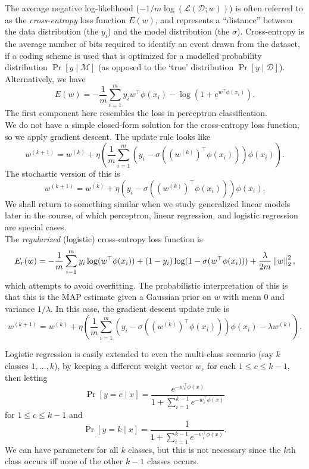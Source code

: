 \documentclass{article}
\begin{document}
		The average negative log-likelihood ($- 1/m \log(\mathcal{L}(\mathcal{D};w))$) is often referred to as the \emph{cross-entropy} loss function $E(w)$, and represents a ``distance'' between the data distribution (the $y_i$) and the model distribution (the $\sigma$). Cross-entropy is the average number of bits required to identify an event drawn from the dataset, if a coding scheme is used that is optimized for a modelled probability distribution $\Pr[y\mid\mathcal{M}]$ (as opposed to the `true' distribution $\Pr[y\mid\mathcal{D}]$).\\
		Alternatively, we have
		\[ E(w) = - \frac{1}{m} \sum_{i=1}^m y_i w^\top \phi(x_i) - \log(1 + e^{w^\top\phi(x_i)}). \]
		The first component here resembles the loss in perceptron classification.\\
		We do not have a simple closed-form solution for the cross-entropy loss function, so we apply gradient descent. The update rule looks like
		\[ w^{(k+1)} = w^{(k)} + \eta \left(\frac{1}{m} \sum_{i=1}^m (y_i - \sigma((w^{(k)})^\top\phi(x_i))) \phi(x_i) \right). \]
		The stochastic version of this is
		\[ w^{(k+1)} = w^{(k)} + \eta (y_i - \sigma((w^{(k)})^\top\phi(x_i))) \phi(x_i). \]
		We shall return to something similar when we study generalized linear models later in the course, of which perceptron, linear regression, and logistic regression are special cases.\\
		The \emph{regularized} (logistic) cross-entropy loss function is
		\[ E_r(w) = -\frac{1}{m} \sum_{i=1}^m y_i \log(w^\top \phi(x_i)) + (1 - y_i) \log(1-\sigma(w^\top\phi(x_i))) + \frac{\lambda}{2m}\left\lVert w\right\rVert_2^2, \]
		which attempts to avoid overfitting. The probabilistic interpretation of this is that this is the MAP estimate given a Gaussian prior on $w$ with mean $0$ and variance $1/\lambda$. In this case, the gradient descent update rule is
		\[ w^{(k+1)} = w^{(k)} + \eta \left(\frac{1}{m} \sum_{i=1}^m (y_i - \sigma((w^{(k)})^\top\phi(x_i))) \phi(x_i) - \lambda w^{(k)} \right). \]

		Logistic regression is easily extended to even the multi-class scenario (say $k$ classes $1,\ldots,k$), by keeping a different weight vector $w_{c}$ for each $1\le c\le k-1$, then letting
		\[ \Pr[y=c\mid x] = \frac{e^{-w_c^\top \phi(x)}}{1 + \sum_{i=1}^{k-1} e^{-w_i^\top \phi(x)}} \]
		for $1\le c\le k-1$ and
		\[ \Pr[y=k\mid x] = \frac{1}{1 + \sum_{i=1}^{k-1} e^{-w_i^\top \phi(x)}}. \]
		We can have parameters for all $k$ classes, but this is not necessary since the $k$th class occurs iff none of the other $k-1$ classes occurs.
\end{document}
